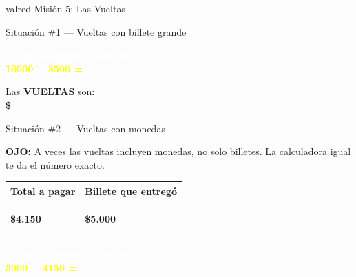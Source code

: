 \documentclass[12pt]{article}
\newcommand{\boxfill}[1][3cm]{%
  \tcbox[on line, size=minimal,
    colframe=valdark!60, colback=white,
    boxrule=1pt, arc=2mm,
    boxsep=4pt, left=3pt, right=3pt, top=3pt, bottom=3pt]%
  {\makebox[#1]{\vphantom{Mg}}}}
\begin{document}
\begin{mision}{valred}{\; Misión 5: Las Vueltas}
\begin{actividad}{Situación \#1 --- Vueltas con billete grande}
\vspace{0.3cm}
\begin{calculadora}
  \textcolor{white}{\textbf{En tu calculadora escribe:}}\\[0.15cm]
  \textcolor{yellow}{\Large \textbf{10000 $-$ 8500 =}}
\end{calculadora}

\vspace{0.3cm}
\begin{center}
  {\Large Las \textbf{VUELTAS} son:}\\[0.3cm]
  {\Large\bfseries \$ \boxfill[4cm]}
\end{center}
\end{actividad}

\vspace{0.4cm}

\begin{actividad}{Situación \#2 --- Vueltas con monedas}

\begin{tcolorbox}[colback=vallightyellow, colframe=valorange,
    arc=2mm, boxrule=1pt]
  \textbf{OJO:} A veces las vueltas incluyen monedas,
  no solo billetes. La calculadora igual te da el número exacto.
\end{tcolorbox}

\vspace{0.2cm}
\begin{center}
\renewcommand{\arraystretch}{1.7}
\begin{tabular}{|m{5cm}|m{5.5cm}|}
  \hline
  \rowcolor{valred!15}
  \textbf{Total a pagar} & \textbf{Billete que entreg\'o} \\
  \hline
  \begin{center}
    \vspace{0.1cm}
    {\LARGE\bfseries \$4.150}
    \vspace{0.1cm}
  \end{center}
  &
  \begin{center}
    \vspace{0.1cm}
    {\LARGE\bfseries \$5.000}
    \vspace{0.1cm}
  \end{center} \\
  \hline
\end{tabular}
\end{center}

\vspace{0.3cm}
\begin{calculadora}
  \textcolor{white}{\textbf{En tu calculadora escribe:}}\\[0.15cm]
  \textcolor{yellow}{\Large \textbf{5000 $-$ 4150 =}}
\end{calculadora}


\end{actividad}
\end{mision}
\end{document}
